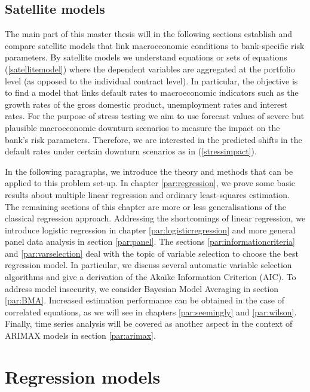 \documentclass[a4paper, 11pt]{scrreprt}
\begin{document}
\subsection{Satellite models}\label{sec:satellite}

The main part of this master thesis will in the following sections establish and compare satellite models that link macroeconomic conditions to bank-specific risk parameters. By satellite models we understand equations or sets of equations (\ref{satellitemodel}) where the dependent variables are aggregated at the portfolio level (as opposed to the individual contract level). 
In particular, the objective is to find a model that links default rates to macroeconomic indicators such as the growth rates of the gross domestic product, unemployment rates and interest rates.
For the purpose of stress testing we aim to use forecast values of severe but plausible macroeconomic downturn scenarios to measure the impact on the bank's risk parameters. 
Therefore, we are interested in the predicted shifts in the default rates under certain downturn scenarios as in (\ref{stressimpact}).

\bigskip

In the following paragraphs, we introduce the theory and methods that can be applied to this problem set-up. In chapter \ref{par:regression}, we prove some basic results about multiple linear regression and ordinary least-squares estimation. 
The remaining sections of this chapter are more or less generalisations of the classical regression approach. Addressing the shortcomings of linear regression, we introduce logistic regression in chapter \ref{par:logisticregression} and more general panel data analysis in section \ref{par:panel}. 
The sections \ref{par:informationcriteria} and \ref{par:varselection} deal with the topic of variable selection to choose the best regression model. In particular, we discuss several automatic variable selection algorithms and give a derivation of the Akaike Information Criterion (AIC).
To address model insecurity, we consider Bayesian Model Averaging in section \ref{par:BMA}.
Increased estimation performance can be obtained in the case of correlated equations, as we will see in chapters \ref{par:seemingly} and \ref{par:wilson}. 
Finally, time series analysis will be covered as another aspect in the context of ARIMAX models in section \ref{par:arimax}.

\section{Regression models}\label{section:logistic regression}
\end{document}
